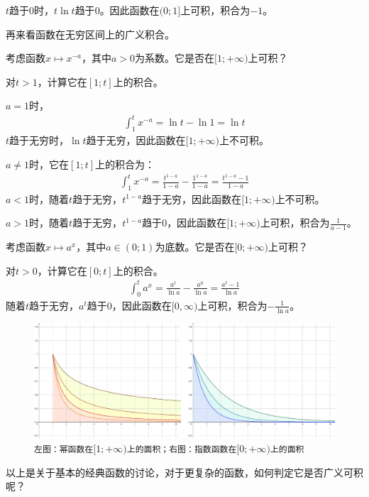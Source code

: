 \documentclass[12pt,UTF8]{ctexbook}
\begin{document}
$t$趋于$0$时，$t\ln{t}$趋于$0$。因此函数在$(0;1]$上可积，积合为$-1$。

再来看函数在无穷区间上的广义积合。

考虑函数$x\mapsto x^{-a}$，其中$a>0$为系数。它是否在$[1;+\infty)$上可积？

对$t>1$，计算它在$[1;t]$上的积合。

$a=1$时，
\begin{align*}
    \int_1^t x^{-a} = \ln{t} - \ln{1} = \ln{t} 
\end{align*}
$t$趋于无穷时，$\ln{t}$趋于无穷，因此函数在$[1;+\infty)$上不可积。

$a\neq 1$时，它在$[1;t]$上的积合为：
\begin{align*}
    \int_1^t x^{-a} = \frac{t^{1-a}}{1 - a} - \frac{1^{1-a}}{1 - a} = \frac{t^{1-a} - 1}{1-a} 
\end{align*}
$a<1$时，随着$t$趋于无穷，$t^{1-a}$趋于无穷，因此函数在$[1;+\infty)$上不可积。

$a>1$时，随着$t$趋于无穷，$t^{1-a}$趋于$0$，因此函数在$[1;+\infty)$上可积，积合为$\frac{1}{a-1}$。

考虑函数$x\mapsto a^x$，其中$a\in(0;1)$为底数。它是否在$[0;+\infty)$上可积？

对$t>0$，计算它在$[0;t]$上的积合。
\begin{align*}
    \int_0^t a^x = \frac{a^t}{\ln{a}} - \frac{a^0}{\ln{a}} = \frac{a^t - 1}{\ln{a}}
\end{align*}
随着$t$趋于无穷，$a^t$趋于$0$，因此函数在$[0,\infty)$上可积，积合为$-\frac{1}{\ln{a}}$。

\begin{figure}[h] %
    \vspace{4pt}
    \centering
    \includegraphics[width=\textwidth]{tu/广义积分2.png}
    \caption*{\texttt{左图：幂函数在}$[1;+\infty)$\texttt{上的面积；右图：指数函数在}$[0;+\infty)$\texttt{上的面积}}
\end{figure}

以上是关于基本的经典函数的讨论，对于更复杂的函数，如何判定它是否广义可积呢？
\end{document}
